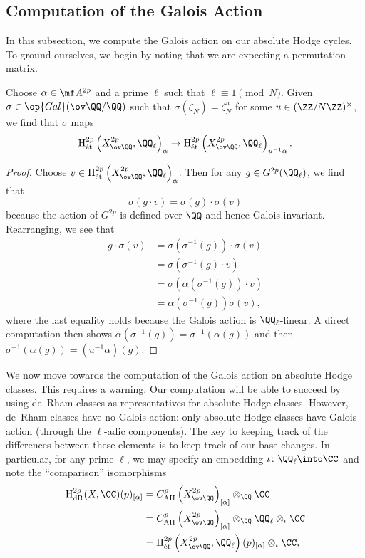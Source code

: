 \documentclass[../thesis.tex]{subfiles}
\begin{document}
\subsection{Computation of the Galois Action}
In this subsection, we compute the Galois action on our absolute Hodge cycles.
To ground ourselves, we begin by noting that we are expecting a permutation matrix.
\begin{lemma}
	Choose $\alpha\in\mf A^{2p}$ and a prime $\ell$ such that $\ell\equiv1\pmod N$. Given $\sigma\in\op{Gal}(\ov\QQ/\QQ)$ such that $\sigma(\zeta_N)=\zeta_N^u$ for some $u\in(\ZZ/N\ZZ)^\times$, we find that $\sigma$ maps
	\[\mathrm H^{2p}_{\mathrm{\acute et}}\left(X_{\ov\QQ}^{2p},\QQ_\ell\right)_\alpha\to\mathrm H^{2p}_{\mathrm{\acute et}}\left(X_{\ov\QQ}^{2p},\QQ_\ell\right)_{u^{-1}\alpha}.\]
\end{lemma}
\begin{proof}
	Choose $v\in \mathrm H^{2p}_{\mathrm{\acute et}}\left(X_{\ov\QQ}^{2p},\QQ_\ell\right)_\alpha$. Then for any $g\in G^{2p}(\QQ_\ell)$, we find that
	\[\sigma(g\cdot v)=\sigma(g)\cdot\sigma(v)\]
	because the action of $G^{2p}$ is defined over $\QQ$ and hence Galois-invariant. Rearranging, we see that
	\begin{align*}
		g\cdot\sigma(v) &= \sigma\left(\sigma^{-1}(g)\right)\cdot\sigma(v) \\
		&= \sigma\left(\sigma^{-1}(g)\cdot v\right) \\
		&= \sigma\left(\alpha\left(\sigma^{-1}(g)\right)\cdot v\right) \\
		&= \alpha\left(\sigma^{-1}(g)\right)\sigma(v),
	\end{align*}
	where the last equality holds because the Galois action is $\QQ_\ell$-linear. A direct computation then shows $\alpha\left(\sigma^{-1}(g)\right)=\sigma^{-1}(\alpha(g))$ and then $\sigma^{-1}(\alpha(g))=\left(u^{-1}\alpha\right)(g)$.
\end{proof}
We now move towards the computation of the Galois action on absolute Hodge classes. This requires a warning. Our computation will be able to succeed by using de~Rham classes as representatives for absolute Hodge classes. However, de~Rham classes have no Galois action: only absolute Hodge classes have Galois action (through the $\ell$-adic components). The key to keeping track of the differences between these elements is to keep track of our base-changes. In particular, for any prime $\ell$, we may specify an embedding $\iota\colon\QQ_\ell\into\CC$ and note the ``comparison'' isomorphisms
\begin{align*}
	\mathrm H^{2p}_{\mathrm{dR}}(X,\CC)(p)_{[\alpha]} &= C^p_{\mathrm{AH}}\left(X^{2p}_{\ov\QQ}\right)_{[\alpha]}\otimes_\QQ\CC \\
	&= C^p_{\mathrm{AH}}\left(X^{2p}_{\ov\QQ}\right)_{[\alpha]}\otimes_\QQ\QQ_\ell\otimes_\iota\CC \\
	&= \mathrm H^{2p}_{\mathrm{\acute et}}\left(X^{2p}_{\ov\QQ},\QQ_\ell\right)(p)_{[\alpha]}\otimes_\iota\CC,
\end{align*}
\end{document}

